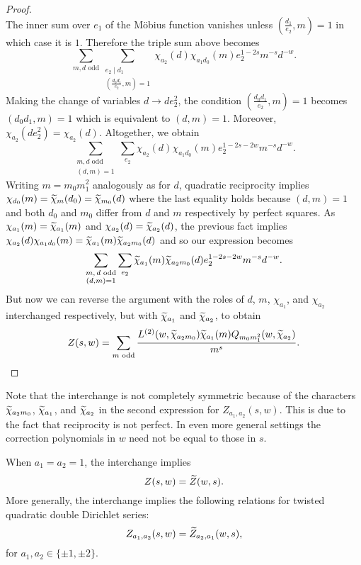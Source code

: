 \documentclass[12pt,reqno,oneside]{amsart}
\begin{document}
\begin{proof}
\[        \]
        The inner sum over $e_{1}$ of the M\"obius function vanishes unless $\left(\frac{d_{1}}{e_{2}},m\right) = 1$ in which case it is $1$. Therefore the triple sum above becomes
        \[
            \sum_{\text{$m,d$ odd}}\sum_{\substack{e_{2} \mid d_{1} \\ \left(\frac{d_{0}d_{1}}{e_{2}},m\right) = 1}}\chi_{a_{2}}(d)\chi_{a_{1}d_{0}}(m)e_{2}^{1-2s}m^{-s}d^{-w}.
        \]
        Making the change of variables $d \to de_{2}^{2}$, the condition $\left(\frac{d_{0}d_{1}}{e_{2}},m\right) = 1$ becomes $(d_{0}d_{1},m) = 1$ which is equivalent to $(d,m) = 1$. Moreover, $\chi_{a_{2}}(de_{2}^{2}) = \chi_{a_{2}}(d)$. Altogether, we obtain
        \[
            \sum_{\substack{\text{$m,d$ odd} \\ (d,m) = 1}}\sum_{e_{2}}\chi_{a_{2}}(d)\chi_{a_{1}d_{0}}(m)e_{2}^{1-2s-2w}m^{-s}d^{-w}.
        \]
        Writing $m = m_{0}m_{1}^{2}$ analogously as for $d$, quadratic reciprocity implies $\chi_{d_{0}}(m) = \widetilde{\chi}_{m}(d_{0}) = \widetilde{\chi}_{m_{0}}(d)$ where the last equality holds because $(d,m) = 1$ and both $d_{0}$ and $m_{0}$ differ from $d$ and $m$ respectively by perfect squares. As $\chi_{a_{1}}(m) = \widetilde{\chi}_{a_{1}}(m)$ and $\chi_{a_{2}}(d) = \widetilde{\chi}_{a_{2}}(d)$, the previous fact implies $\chi_{a_{2}}(d)\chi_{a_{1}d_{0}}(m) = \widetilde{\chi}_{a_{1}}(m)\widetilde{\chi}_{a_{2}m_{0}}(d)$ and so our expression becomes
        \[
            \sum_{\substack{\text{$m,d$ odd} \\ (d,m) = 1}}\sum_{e_{2}}\widetilde{\chi}_{a_{1}}(m)\widetilde{\chi}_{a_{2}m_{0}}(d)e_{2}^{1-2s-2w}m^{-s}d^{-w}.
        \]
        But now we can reverse the argument with the roles of $d$, $m$, $\chi_{a_{1}}$, and $\chi_{a_{2}}$ interchanged respectively, but with $\widetilde{\chi}_{a_{1}}$ and $\widetilde{\chi}_{a_{2}}$, to obtain
        \[
            Z(s,w) = \sum_{\text{$m$ odd}}\frac{L^{(2)}(w,\widetilde{\chi}_{a_{2}m_{0}})\widetilde{\chi}_{a_{1}}(m)Q_{m_{0}m_{1}^{2}}(w,\widetilde{\chi}_{a_{2}})}{m^{s}}.
        \]
    \end{proof}

    Note that the interchange is not completely symmetric because of the characters $\widetilde{\chi}_{a_{2}m_{0}}$, $\widetilde{\chi}_{a_{1}}$, and $\widetilde{\chi}_{a_{2}}$ in the second expression for $Z_{a_{1},a_{2}}(s,w)$. This is due to the fact that reciprocity is not perfect. In even more general settings the correction polynomials in $w$ need not be equal to those in $s$.

    \begin{remark}\label{rem:symmetry_of_Double_Dirichlet_series}
        When $a_{1} = a_{2} = 1$, the interchange implies
        \[
            Z(s,w) = \widetilde{Z}(w,s).
        \]
        More generally, the interchange implies the following relations for twisted quadratic double Dirichlet series:
        \[
            Z_{a_{1},a_{2}}(s,w) = \widetilde{Z}_{a_{2},a_{1}}(w,s),
        \]
        for $a_{1},a_{2} \in \{\pm1,\pm2\}$.
    \end{remark}
\end{document}
